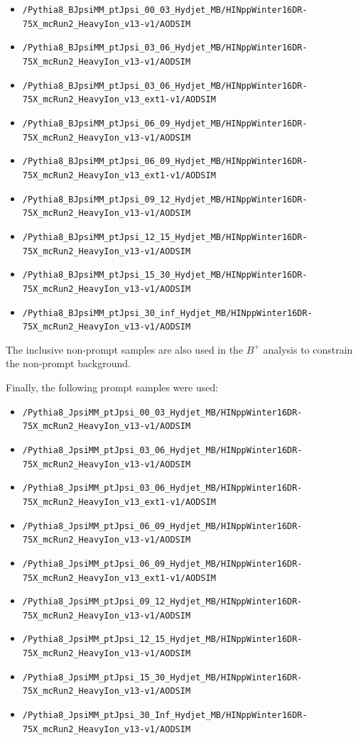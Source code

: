\begin{itemize}
\tiny \item \verb#/Pythia8_BJpsiMM_ptJpsi_00_03_Hydjet_MB/HINppWinter16DR-75X_mcRun2_HeavyIon_v13-v1/AODSIM# 
\item  \verb#/Pythia8_BJpsiMM_ptJpsi_03_06_Hydjet_MB/HINppWinter16DR-75X_mcRun2_HeavyIon_v13-v1/AODSIM# 
\item  \verb#/Pythia8_BJpsiMM_ptJpsi_03_06_Hydjet_MB/HINppWinter16DR-75X_mcRun2_HeavyIon_v13_ext1-v1/AODSIM# 
\item  \verb#/Pythia8_BJpsiMM_ptJpsi_06_09_Hydjet_MB/HINppWinter16DR-75X_mcRun2_HeavyIon_v13-v1/AODSIM# 
\item  \verb#/Pythia8_BJpsiMM_ptJpsi_06_09_Hydjet_MB/HINppWinter16DR-75X_mcRun2_HeavyIon_v13_ext1-v1/AODSIM# 
\item  \verb#/Pythia8_BJpsiMM_ptJpsi_09_12_Hydjet_MB/HINppWinter16DR-75X_mcRun2_HeavyIon_v13-v1/AODSIM# 
\item  \verb#/Pythia8_BJpsiMM_ptJpsi_12_15_Hydjet_MB/HINppWinter16DR-75X_mcRun2_HeavyIon_v13-v1/AODSIM# 
\item  \verb#/Pythia8_BJpsiMM_ptJpsi_15_30_Hydjet_MB/HINppWinter16DR-75X_mcRun2_HeavyIon_v13-v1/AODSIM# 
\item  \verb#/Pythia8_BJpsiMM_ptJpsi_30_inf_Hydjet_MB/HINppWinter16DR-75X_mcRun2_HeavyIon_v13-v1/AODSIM# 

\end{itemize}

The inclusive non-prompt  \JPsi samples are also used in the $B^+$ analysis to constrain the non-prompt background.

Finally, the following prompt \JPsi samples were used:

\begin{itemize}
\tiny \item  \verb#/Pythia8_JpsiMM_ptJpsi_00_03_Hydjet_MB/HINppWinter16DR-75X_mcRun2_HeavyIon_v13-v1/AODSIM# 
\item  \verb#/Pythia8_JpsiMM_ptJpsi_03_06_Hydjet_MB/HINppWinter16DR-75X_mcRun2_HeavyIon_v13-v1/AODSIM# 
\item  \verb#/Pythia8_JpsiMM_ptJpsi_03_06_Hydjet_MB/HINppWinter16DR-75X_mcRun2_HeavyIon_v13_ext1-v1/AODSIM# 
\item  \verb#/Pythia8_JpsiMM_ptJpsi_06_09_Hydjet_MB/HINppWinter16DR-75X_mcRun2_HeavyIon_v13-v1/AODSIM# 
\item  \verb#/Pythia8_JpsiMM_ptJpsi_06_09_Hydjet_MB/HINppWinter16DR-75X_mcRun2_HeavyIon_v13_ext1-v1/AODSIM# 
\item  \verb#/Pythia8_JpsiMM_ptJpsi_09_12_Hydjet_MB/HINppWinter16DR-75X_mcRun2_HeavyIon_v13-v1/AODSIM# 
\item  \verb#/Pythia8_JpsiMM_ptJpsi_12_15_Hydjet_MB/HINppWinter16DR-75X_mcRun2_HeavyIon_v13-v1/AODSIM# 
\item  \verb#/Pythia8_JpsiMM_ptJpsi_15_30_Hydjet_MB/HINppWinter16DR-75X_mcRun2_HeavyIon_v13-v1/AODSIM# 
\item  \verb#/Pythia8_JpsiMM_ptJpsi_30_Inf_Hydjet_MB/HINppWinter16DR-75X_mcRun2_HeavyIon_v13-v1/AODSIM# 
\end{itemize}

